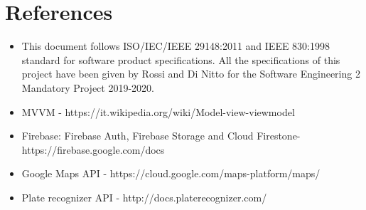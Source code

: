 \documentclass[../RASD.tex]{subfiles}
\begin{document}
\chapter{References}\label{ch:references}
    \begin{itemize}
        \item This document follows ISO/IEC/IEEE 29148:2011 and IEEE 830:1998 standard for software product specifications.
        All the specifications of this project have been given by Rossi and Di Nitto for the Software Engineering 2 Mandatory Project 2019-2020.
        \item MVVM - https://it.wikipedia.org/wiki/Model-view-viewmodel
        \item Firebase: Firebase Auth, Firebase Storage and Cloud Firestone- https://firebase.google.com/docs
        \item Google Maps API - https://cloud.google.com/maps-platform/maps/
        \item Plate recognizer API - http://docs.platerecognizer.com/
    \end{itemize}
\end{document}
